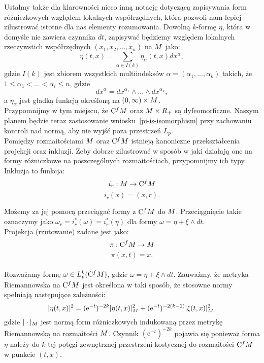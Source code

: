 \documentclass[licencjacka]{pracamgr}
\theoremstyle{definition}
\theoremstyle{definition}
\theoremstyle{plain}
\theoremstyle{plain}
\theoremstyle{plain}
\theoremstyle{plain}
\def\cfm{\ensuremath\mathrm{C}^fM}
\def\M{\ensuremath M}
\begin{document}
Ustalmy także dla klarowności nieco inną notację dotyczącą zapisywania
form różniczkowych względem lokalnych współrzędnych, która pozwoli nam 
lepiej zilustrować istotne dla nas elementy rozumowania. Dowolną $k$-formę $\eta$,
która w domyśle nie zawiera czynnika $dt$, zapisywać będziemy względem
lokalnych rzeczywstich współrzędnych
$(x_1, x_2, ... , x_n)$ na $\M$ jako:
\[
    \eta(t, x) = \sum_{\alpha \in I(k)} \eta_\alpha (t, x) dx^\alpha,
\]
gdzie $I(k)$ jest zbiorem wszystkich multiindeksów $\alpha = (\alpha_1, ...,
\alpha_k)$ takich, że $1 \leq \alpha_1 < ... < \alpha_i \leq n$, gdzie
\begin{equation}\label{notacja}
    dx^\alpha = dx^{\alpha_1} \wedge ... \wedge dx^{\alpha_k},
\end{equation}
a $\eta_\alpha$ jest gładką funkcją określoną na $(0, \infty) \times \M$. \\

Przypomnijmy w tym miejscu, że $\cfm$ oraz $\M \times R_+$ są
dyfeomorficzne.  Naszym planem będzie teraz zastosowanie
wniosku~\ref{pi-is-isomorphism} przy zachowaniu kontroli nad normą,
aby nie wyjść poza przestrzeń $L_p$. \\



Pomiędzy rozmaitościami $\M$ oraz $\cfm$ istnieją kanoniczne przekształcenia
projekcji oraz inkluzji. Żeby dobrze zilustrować w sposób w jaki działają one
na formy różniczkowe na poszczególnych rozmaitościach, przypomnijmy ich typy.
Inkluzja to funkcja:
\[
    i_r: \M \rightarrow \cfm \\
\]
\[
    i_r(x) = (x, r).
\]

Możemy za jej pomocą przeciągać formy z $\cfm$ do $\M$. Przeciągnięcie takie
oznaczymy jako $\omega_r = i_r^\ast(\omega) = i_r^\ast (\eta) $ dla formy $\omega
= \eta + \xi \wedge dt$. \\
Projekcja (rzutowanie) zadane jest jako:
\[
    \pi: \cfm \rightarrow \M
\]
\[
    \pi (x, t) = x.
\] \\


Rozważamy formę $\omega \in L^k_p (\cfm)$, gdzie
$\omega = \eta + \xi \wedge dt$.
Zauważmy, że metryka Riemannowska na $\cfm$ jest określona w taki sposób, że
stosowne normy spełniają następujące zależności:
$$
| \eta(t,x) |^2 = (\mathrm{e}^{-t})^{-2k} | \eta(t,x) |^2_{\M} +
(\mathrm{e}^{-t})^{-2(k-1)} | \xi(t,x) |^2_{\M},
$$
gdzie $|\cdot |_{\M} $ jest normą form różniczkowych indukowaną przez
metrykę Riemannowską na rozmaitości $\M$.  Czynnik $(\mathrm{e}^{-t})^{-2k}$
pojawia się ponieważ forma $\eta$ należy do $k$-tej potęgi zewnętrznej
przestrzeni kostycznej do rozmaitości $\cfm$ w punkcie $(t,x)$.  \\
\end{document}
